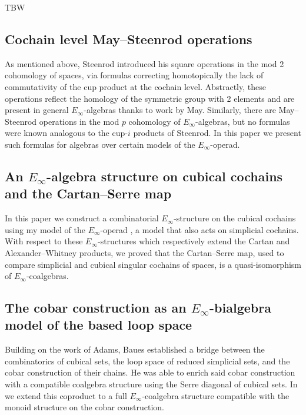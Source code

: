 \documentclass{amsart}
\theoremstyle{definition}
\begin{document}
	TBW

	\subsection{Cochain level May--Steenrod operations \cite{medina2021may_st}}

	As mentioned above, Steenrod introduced his square operations in the mod 2 cohomology of spaces, via formulas correcting homotopically the lack of commutativity of the cup product at the cochain level.
	Abstractly, these operations reflect the homology of the symmetric group with 2 elements and are present in general $E_\infty$-algebras thanks to work by May.
	Similarly, there are May--Steenrod operations in the mod $p$ cohomology of $E_\infty$-algebras, but no formulas were known analogous to the cup-$i$ products of Steenrod.
	In this paper we present such formulas for algebras over certain models of the $E_\infty$-operad.

	\subsection{An $E_\infty$-algebra structure on cubical cochains and the Cartan--Serre map \cite{medina2022cube_einfty}}

	In this paper we construct a combinatorial $E_\infty$-structure on the cubical cochains using my model of the $E_\infty$-operad \cite{medina2020prop1}, a model that also acts on simplicial cochains.
	With respect to these $E_\infty$-structures which respectively extend the Cartan and Alexander--Whitney products, we proved that the Cartan--Serre map, used to compare simplicial and cubical singular cochains of spaces, is a quasi-isomorphism of $E_\infty$-coalgebras.

	\subsection{The cobar construction as an $E_\infty$-bialgebra model of the based loop space}

	Building on the work of Adams, Baues established a bridge between the combinatorics of cubical sets, the loop space of reduced simplicial sets, and the cobar construction of their chains.
	He was able to enrich said cobar construction with a compatible coalgebra structure using the Serre diagonal of cubical sets.
	In \cite{medina2021cobar} we extend this coproduct to a full $E_\infty$-coalgebra structure compatible with the monoid structure on the cobar construction.
\end{document}
